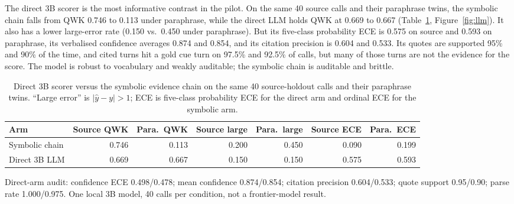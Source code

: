 \documentclass[11pt,a4paper]{article}
\begin{document}
The direct 3B scorer is the most informative contrast in the pilot. On the same 40 source calls
and their paraphrase twins, the symbolic chain falls from QWK 0.746 to 0.113 under paraphrase,
while the direct LLM holds QWK at 0.669 to 0.667 (Table~\ref{tab:llm}, Figure~\ref{fig:llm}).
It also has a lower large-error rate (0.150 vs.\ 0.450 under paraphrase). But its five-class
probability ECE is 0.575 on source and 0.593 on paraphrase, its verbalised confidence averages
0.874 and 0.854, and its citation precision is 0.604 and 0.533. Its quotes are supported 95\%
and 90\% of the time, and cited turns hit a gold cue turn on 97.5\% and 92.5\% of calls, but
many of those turns are not the evidence for the score. The model is robust to vocabulary and
weakly auditable; the symbolic chain is auditable and brittle.

\begin{table}[t]
\centering
\caption{Direct 3B scorer versus the symbolic evidence chain on the same 40 source-holdout calls
and their paraphrase twins. ``Large error'' is $|\hat y-y|>1$; ECE is five-class probability ECE
for the direct arm and ordinal ECE for the symbolic arm.}
\label{tab:llm}
\begin{threeparttable}
\small
\begin{tabular}{@{}lrrrrrr@{}}
\toprule
Arm & Source QWK & Para.\ QWK & Source large & Para.\ large & Source ECE & Para.\ ECE \\
\midrule
Symbolic chain & 0.746 & 0.113 & 0.200 & 0.450 & 0.090 & 0.199 \\
Direct 3B LLM & 0.669 & 0.667 & 0.150 & 0.150 & 0.575 & 0.593 \\
\bottomrule
\end{tabular}
\begin{tablenotes}\footnotesize
\item Direct-arm audit: confidence ECE 0.498/0.478; mean confidence 0.874/0.854; citation
precision 0.604/0.533; quote support 0.95/0.90; parse rate 1.000/0.975. One local 3B model, 40
calls per condition, not a frontier-model result.
\end{tablenotes}
\end{threeparttable}
\end{table}
\end{document}
